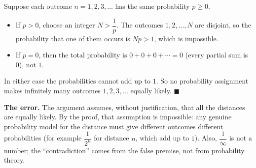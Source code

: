 Suppose each outcome $n=1,2,3,\dots$ has the same probability $p\ge0$.
\begin{itemize}
\item If $p>0$, choose an integer $N>\dfrac{1}{p}$. The outcomes $1,2,\dots,N$ are disjoint, so the probability that one of them occurs is $Np>1$, which is impossible.
\item If $p=0$, then the total probability is $0+0+0+\cdots=0$ (every partial sum is $0$), not $1$.
\end{itemize}
In either case the probabilities cannot add up to $1$. So no probability assignment makes infinitely many outcomes $1,2,3,\dots$ equally likely. $\blacksquare$

\textbf{The error.} The argument assumes, without justification, that all the distances are equally likely. By the proof, that assumption is impossible: any genuine probability model for the distance must give different outcomes different probabilities (for example $\dfrac{1}{2^n}$ for distance $n$, which add up to $1$). Also, $\dfrac{1}{\infty}$ is not a number; the ``contradiction'' comes from the false premise, not from probability theory.
